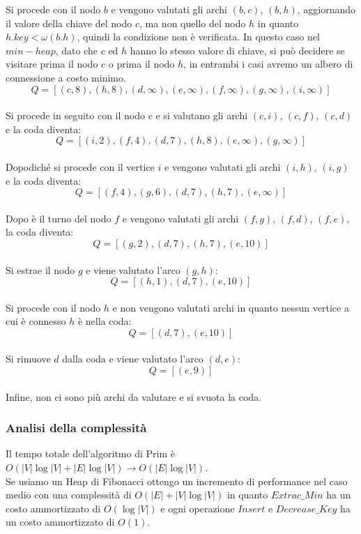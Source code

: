 Si procede con il nodo $b$ e vengono valutati gli archi $(b, c)$, $(b, h)$, aggiornando il valore della
chiave del nodo $c$, ma non quello del nodo $h$ in quanto $h.key < \omega(b.h)$, quindi la condizione non
è verificata. In questo caso nel $min-heap$, dato che $c$ ed $h$ hanno lo stesso valore di chiave, si
può decidere se visitare prima il nodo $c$ o prima il nodo $h$, in entrambi i casi avremo un albero
di connessione a costo minimo.\\
$$ Q=[(c,8),(h,8),(d,\infty),(e,\infty),(f,\infty),(g,\infty),(i,\infty)] $$\\
Si procede in seguito con il nodo c e si valutano gli archi $(c, i)$, $(c, f)$, $(c, d)$ e la coda diventa:\\
$$ Q=[(i,2),(f,4),(d,7),(h,8),(e,\infty),(g,\infty)]$$\\
Dopodiché si procede con il vertice $i$ e vengono valutati gli archi $(i, h)$, $(i, g)$ e la coda diventa:\\
$$ Q=[(f,4),(g,6),(d,7),(h,7),(e,\infty)] $$\\
Dopo è il turno del nodo $f$ e vengono valutati gli archi $(f, g)$, $(f, d)$, $(f, e)$, la coda diventa:\\
$$ Q=[(g,2),(d,7),(h,7),(e,10)] $$\\
Si estrae il nodo $g$ e viene valutato l’arco $(g, h)$:\\
$$ Q= [(h,1),(d,7),(e,10)] $$\\
Si procede con il nodo $h$ e non vengono valutati archi in quanto nessun vertice a cui è connesso
$h$ è nella coda:\\
$$ Q= [(d,7),(e,10)] $$\\
Si rimuove $d$ dalla coda e viene valutato l’arco $(d, e)$:\\
$$ Q=[(e,9)] $$\\
Infine, non ci sono più archi da valutare e si svuota la coda.
\subsubsection{Analisi della complessità}
Il tempo totale dell'algoritmo di Prim è $O(|V| \log |V| + |E| \log |V|) \rightarrow O(|E| \log |V|)$.\\
Se usiamo un Heap di Fibonacci ottengo un incremento di performance nel caso medio con una complessità di $O(|E|+|V| \log |V|)$ in quanto 
$Extrac\_Min$ ha un costo ammortizzato di $O(\log |V|)$ e ogni operazione $Insert$ e $Decrease\_Key$ ha un costo ammortizzato di $O(1)$.
